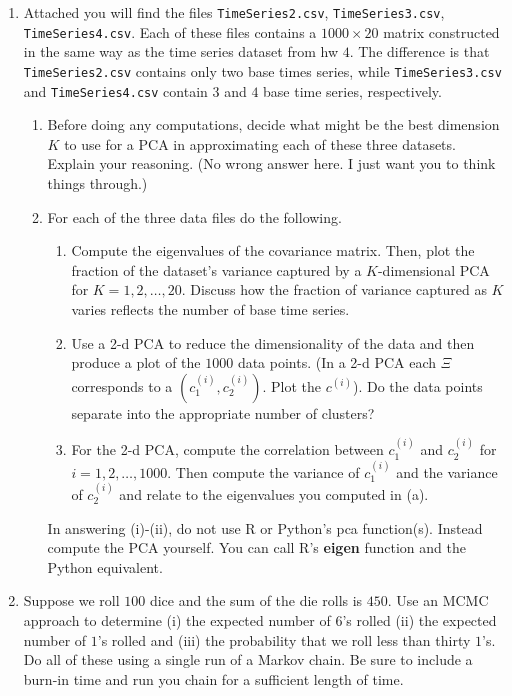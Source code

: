 \documentclass{article}
\begin{document}
\begin{enumerate} 

\item Attached you will find the files \verb+TimeSeries2.csv+, \verb+TimeSeries3.csv+, \verb+TimeSeries4.csv+.  Each of these files contains a $1000 \times 20$ matrix constructed in the same way as the time series dataset from hw $4$.   The difference is that \verb+TimeSeries2.csv+ contains only two base times series, while \verb+TimeSeries3.csv+ and \verb+TimeSeries4.csv+ contain $3$ and $4$ base time series, respectively.  
\begin{enumerate}
\item Before doing any computations, decide what might be the best dimension $K$ to use for a PCA in approximating each of these three datasets.   Explain your reasoning.  (No wrong answer here.  I just want you to think things through.)
\item For each of the three data files do the following.  
\begin{enumerate}
\item Compute the eigenvalues of the covariance matrix.  Then, plot the fraction of the dataset's variance captured by a $K$-dimensional PCA for $K=1,2,\dots,20$.  Discuss how the fraction of variance captured as $K$ varies reflects  the number of base time series.  
\item Use a 2-d PCA to reduce the dimensionality of the data and then produce a plot of the $1000$ data points.   (In a 2-d PCA each $\Xi$ corresponds to a $(c^{(i)}_1, c^{(i)}_2)$.  Plot the $c^{(i)}$).  Do the data points separate into the appropriate number of clusters?   
\item For the 2-d PCA, compute the correlation between $c^{(i)}_1$ and $c^{(i)}_2$ for $i=1,2,\dots,1000$.   Then compute the variance of $c^{(i)}_1$ and the variance of $c^{(i)}_2$ and relate to the eigenvalues you computed in (a).
\end{enumerate}
In answering (i)-(ii), do not use R or Python's pca function(s).  Instead compute the PCA yourself.  You can call R's \textbf{eigen} function and the Python equivalent.
\end{enumerate}

\item Suppose we roll $100$ dice and the sum of the die rolls is $450$.  Use an MCMC approach to determine (i) the expected number of $6$'s rolled (ii) the expected number of $1$'s rolled and (iii) the probability that we roll less than thirty $1$'s.  Do all of these using a single run of a Markov chain.  Be sure to include a burn-in time and run you chain for a sufficient length of time.
\end{enumerate}
\end{document}
